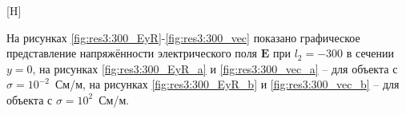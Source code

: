 \documentclass[a4paper,14pt]{article}
\makeatletter
\renewenvironment{figure}[1][\fps@figure]{
  \edef\@tempa{\noexpand\@float{figure}[#1]}
  \@tempa
  \addtocounter{foofigure}{1}
}{
  \end@float
}
\renewcommand{\Re}{\mathop{\mathrm{Re}}\nolimits}
\makeatother
\begin{document}
\begin{figure}[H]
	\centering
	\text{~~}
	\caption{$\Re(\mathbf{E}_z)$ при $l_2=-200$}
	\label{fig:res3:200_EzR}
\end{figure}

На рисунках \ref{fig:res3:300_EyR}-\ref{fig:res3:300_vec} показано графическое представление напряжённости электрического поля $\mathbf{E}$ при $l_2=-300$ в сечении $y=0$, на рисунках \ref{fig:res3:300_EyR_a} и \ref{fig:res3:300_vec_a} -- для объекта с $\sigma=10^{-2}$~См/м, на рисунках \ref{fig:res3:300_EyR_b} и \ref{fig:res3:300_vec_b} -- для объекта с $\sigma=10^{2}$~См/м.
\end{document}
